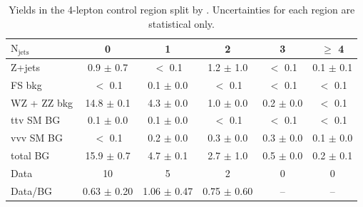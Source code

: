 \begin{table}[htb]
  \scriptsize
  \begin{center}
    \caption{\label{tab:njets_CR4lep} 
      Yields in the 4-lepton control region split by \nj. Uncertainties for each region are statistical only. 
    }
    \begin{tabular}{l|c|c|c|c|c}
      \hline
      \hline
      $\mathrm{N_{jets}}$ &0  & 1  & 2  & 3  & $\geq$ 4 \\
      \hline 
      Z+jets&  0.9 $\pm$ 0.7 &  $<$ 0.1 &  1.2 $\pm$ 1.0 &  $<$ 0.1 &  0.1 $\pm$ 0.1 \\ 
      FS bkg&  $<$ 0.1 &  0.1 $\pm$ 0.0 &  $<$ 0.1 &  $<$ 0.1 &  $<$ 0.1 \\ 
      WZ + ZZ bkg&  14.8 $\pm$ 0.1 &  4.3 $\pm$ 0.0 &  1.0 $\pm$ 0.0 &  0.2 $\pm$ 0.0 &  $<$ 0.1 \\ 
      ttv SM BG&  0.1 $\pm$ 0.0 &  0.1 $\pm$ 0.0 &  $<$ 0.1 &  $<$ 0.1 &  $<$ 0.1 \\ 
      vvv SM BG&  $<$ 0.1 &  0.2 $\pm$ 0.0 &  0.3 $\pm$ 0.0 &  0.3 $\pm$ 0.0 &  0.1 $\pm$ 0.0 \\ 
      \hline 
      total BG&  15.9 $\pm$ 0.7 &  4.7 $\pm$ 0.1 &  2.7 $\pm$ 1.0 &  0.5 $\pm$ 0.0 &  0.2 $\pm$ 0.1 \\ 
      \hline 
      Data&  10 &  5 &  2 &  0 &  0 \\ 
      \hline 
      Data/BG&  0.63 $\pm$ 0.20 &  1.06 $\pm$ 0.47 &  0.75 $\pm$ 0.60 &  -- &  -- \\ 
      \hline
      \hline
    \end{tabular}
  \end{center}
\end{table}

\clearpage
